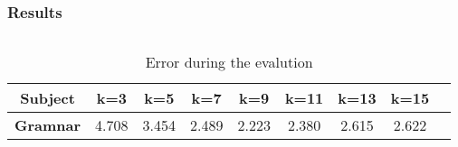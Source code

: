\documentclass{beamer}
\begin{document}
    \begin{frame}
        \frametitle{Results}
        \begin{columns}
            \begin{column}{\paperwidth}
                \begin{table}
                    \centering
                \caption{Error during the evalution}
                \label{tab:3} \centering
                \begin{tabular}{| *{9}{c |} }
                    \hline
                    \textbf{Subject}  & \textbf{k=3} & \textbf{k=5} & \textbf{k=7} &
                    \textbf{k=9} & \textbf{k=11} & \textbf{k=13} & \textbf{k=15} \\ \hline
                    \textbf{Gramnar}& 4.708 & 3.454 & 2.489 & 2.223 & 2.380 & 2.615 & 2.622  \\ \hline
                \end{tabular}
                \end{table}
            \end{column}
        \end{columns}
    \end{frame}
\end{document}

